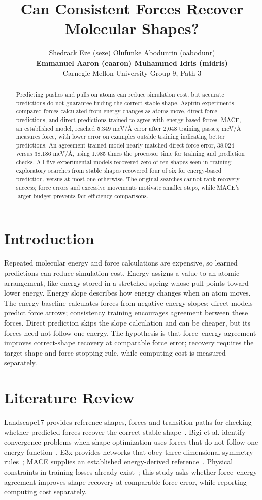 \documentclass{article}
\title{Can Consistent Forces Recover Molecular Shapes?}
\author{Shedrack Eze (seze) \quad Olufunke Abodunrin (oabodunr)\\
\textbf{Emmanuel Aaron (eaaron) \quad Muhammed Idris (midris)}\\
Carnegie Mellon University \quad Group 9, Path 3}
\begin{document}
\maketitle
\begin{abstract}
Predicting pushes and pulls on atoms can reduce simulation cost, but accurate predictions do not guarantee finding the correct stable shape. Aspirin experiments compared forces calculated from energy changes as atoms move, direct force predictions, and direct predictions trained to agree with energy-based forces. MACE, an established model, reached 5.349 meV/Å error after 2,048 training passes; meV/Å measures force, with lower error on examples outside training indicating better predictions. An agreement-trained model nearly matched direct force error, 38.024 versus 38.186 meV/Å, using 1.985 times the processor time for training and prediction checks. All five experimental models recovered zero of ten shapes seen in training; exploratory searches from stable shapes recovered four of six for energy-based prediction, versus at most one otherwise. The original searches cannot rank recovery success; force errors and excessive movements motivate smaller steps, while MACE's larger budget prevents fair efficiency comparisons.
\end{abstract}
\section{Introduction}
Repeated molecular energy and force calculations are expensive, so learned predictions can reduce simulation cost. Energy assigns a value to an atomic arrangement, like energy stored in a stretched spring whose pull points toward lower energy. Energy slope describes how energy changes when an atom moves. The energy baseline calculates forces from negative energy slopes; direct models predict force arrows; consistency training encourages agreement between these forces. Direct prediction skips the slope calculation and can be cheaper, but its forces need not follow one energy. The hypothesis is that force--energy agreement improves correct-shape recovery at comparable force error; recovery requires the target shape and force stopping rule, while computing cost is measured separately.
\section{Literature Review}
Landscape17 provides reference shapes, forces and transition paths for checking whether predicted forces recover the correct stable shape~\cite{landscape}. Bigi et al. identify convergence problems when shape optimization uses forces that do not follow one energy function~\cite{bigi}. E3x provides networks that obey three-dimensional symmetry rules~\cite{e3x}; MACE supplies an established energy-derived reference~\cite{mace}. Physical constraints in training losses already exist~\cite{takamoto}; this study asks whether force--energy agreement improves shape recovery at comparable force error, while reporting computing cost separately.
\end{document}
